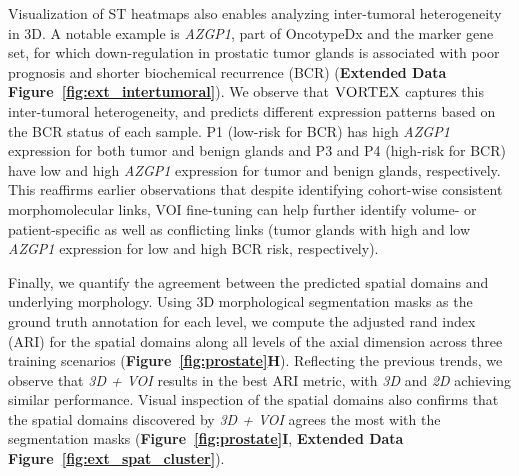 Visualization of ST heatmaps also enables analyzing inter-tumoral heterogeneity in 3D. A notable example is \textit{AZGP1}, part of OncotypeDx and the marker gene set, for which down-regulation in prostatic tumor glands is associated with poor prognosis and shorter biochemical recurrence (BCR)\cite{lapointe2004gene, burdelski2016reduced, kristensen2019predictive} (\textbf{Extended Data Figure~\ref{fig:ext_intertumoral}}). We observe that $\textsc{VORTEX}$ captures this inter-tumoral heterogeneity, and predicts different expression patterns based on the BCR status of each sample. P1 (low-risk for BCR) has high \textit{AZGP1} expression for both tumor and benign glands and P3 and P4 (high-risk for BCR) have low and high \textit{AZGP1} expression for tumor and benign glands, respectively. This reaffirms earlier observations that despite identifying cohort-wise consistent morphomolecular links, VOI fine-tuning can help further identify volume- or patient-specific as well as conflicting links (tumor glands with high and low \textit{AZGP1} expression for low and high BCR risk, respectively). 

Finally, we quantify the agreement between the predicted spatial domains and underlying morphology. Using 3D morphological segmentation masks as the ground truth annotation for each level, we compute the adjusted rand index (ARI) for the spatial domains along all levels of the axial dimension across three training scenarios (\textbf{Figure~\ref{fig:prostate}H}). Reflecting the previous trends, we observe that \textit{3D + VOI} results in the best ARI metric, with \textit{3D} and \textit{2D} achieving similar performance. Visual inspection of the spatial domains also confirms that the spatial domains discovered by \textit{3D + VOI} agrees the most with the segmentation masks (\textbf{Figure~\ref{fig:prostate}I}, \textbf{Extended Data Figure~\ref{fig:ext_spat_cluster}}). 



